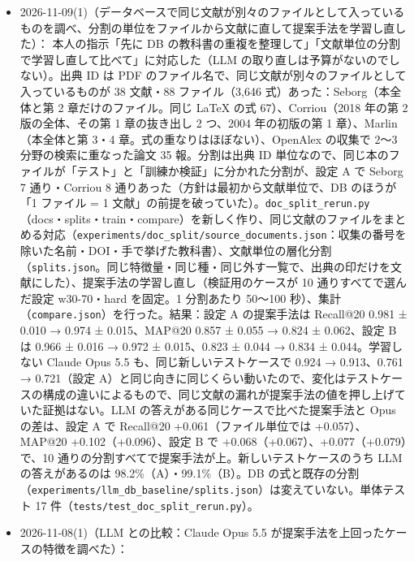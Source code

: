 \documentclass[11pt,a4paper]{jsarticle}
\begin{document}
\begin{itemize}[nosep]
  \item 2026-11-09(1)（データベースで同じ文献が別々のファイルとして入っているものを調べ、分割の単位をファイルから文献に直して提案手法を学習し直した）：
    本人の指示「先に DB の教科書の重複を整理して」「文献単位の分割で学習し直して比べて」に対応した（LLM の取り直しは予算がないのでしない）。出典 ID は PDF のファイル名で、同じ文献が別々のファイルとして入っているものが 38 文献・88 ファイル（3,646 式）あった：Seborg（本全体と第 2 章だけのファイル。同じ LaTeX の式 67）、Corriou（2018 年の第 2 版の全体、その第 1 章の抜き出し 2 つ、2004 年の初版の第 1 章）、Marlin（本全体と第 3・4 章。式の重なりはほぼない）、OpenAlex の収集で 2〜3 分野の検索に重なった論文 35 報。分割は出典 ID 単位なので、同じ本のファイルが「テスト」と「訓練か検証」に分かれた分割が、設定 A で Seborg 7 通り・Corriou 8 通りあった（方針は最初から文献単位で、DB のほうが「1 ファイル = 1 文献」の前提を破っていた）。\texttt{doc\_split\_rerun.py}（docs・splits・train・compare）を新しく作り、同じ文献のファイルをまとめる対応（\texttt{experiments/doc\_split/source\_documents.json}：収集の番号を除いた名前・DOI・手で挙げた教科書）、文献単位の層化分割（\texttt{splits.json}。同じ特徴量・同じ種・同じ外す一覧で、出典の印だけを文献にした）、提案手法の学習し直し（検証用のケースが 10 通りすべてで選んだ設定 w30-70・hard を固定。1 分割あたり 50〜100 秒）、集計（\texttt{compare.json}）を行った。結果：設定 A の提案手法は Recall@20 0.981 ± 0.010 → 0.974 ± 0.015、MAP@20 0.857 ± 0.055 → 0.824 ± 0.062、設定 B は 0.966 ± 0.016 → 0.972 ± 0.015、0.823 ± 0.044 → 0.834 ± 0.044。学習しない Claude Opus 5.5 も、同じ新しいテストケースで 0.924 → 0.913、0.761 → 0.721（設定 A）と同じ向きに同じくらい動いたので、変化はテストケースの構成の違いによるもので、同じ文献の漏れが提案手法の値を押し上げていた証拠はない。LLM の答えがある同じケースで比べた提案手法と Opus の差は、設定 A で Recall@20 +0.061（ファイル単位では +0.057）、MAP@20 +0.102（+0.096）、設定 B で +0.068（+0.067）、+0.077（+0.079）で、10 通りの分割すべてで提案手法が上。新しいテストケースのうち LLM の答えがあるのは 98.2\%（A）・99.1\%（B）。DB の式と既存の分割（\texttt{experiments/llm\_db\_baseline/splits.json}）は変えていない。単体テスト 17 件（\texttt{tests/test\_doc\_split\_rerun.py}）。
  \item 2026-11-08(1)（LLM との比較：Claude Opus 5.5 が提案手法を上回ったケースの特徴を調べた）：

\end{itemize}
\end{document}

